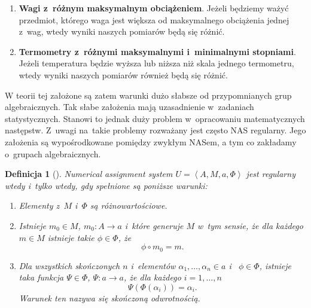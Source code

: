 \documentclass[12pt,a4paper]{report}
\newtheorem{definition}{Definicja}[chapter]
\newcommand{\tuple}[1]{\left\langle {#1} \right\rangle}
\begin{document}
\begin{enumerate}
\item
\textbf{Wagi z~różnym maksymalnym obciążeniem}. Jeżeli będziemy ważyć przedmiot, którego waga jest większa od maksymalnego obciążenia jednej z~wag, wtedy wyniki naszych pomiarów będą się różnić. 
\item
\textbf{Termometry z~różnymi maksymalnymi i~minimalnymi stopniami}. Jeżeli temperatura będzie wyższa lub niższa niż skala jednego termometru, wtedy wyniki naszych pomiarów również będą się różnić.
\end{enumerate}  
W teorii tej założone są zatem warunki dużo słabsze od przypomnianych grup algebraicznych. Tak słabe założenia mają uzasadnienie w~zadaniach statystycznych. Stanowi to jednak duży problem w~opracowaniu matematycznych następstw. Z~uwagi na~takie problemy rozważany jest często NAS regularny. Jego założenia są wypośrodkowane pomiędzy zwykłym NASem, a tym co zakładamy o~grupach algebraicznych.  
\begin{definition}[{\citep[Def. 2]{adams1965theory}}]
Numerical assignment system $U=\tuple{A, M, a, \Phi}$ jest regularny wtedy i~tylko wtedy, gdy spełnione są poniższe warunki:
\begin{enumerate}
\item
Elementy z~$M$ i~$\Phi$ są różnowartościowe.
\item
Istnieje $m_{0}\in M$, $m_0:A\to a$ i~które generuje $M$ w~tym sensie, że dla każdego $m\in M$ istnieje takie $\phi\in \Phi$, że
$$
\phi \circ m_{0}=m.
$$
\item
Dla wszystkich skończonych $n$ i~elementów $\alpha_{1},\dots,\alpha_{n}\in a$ i~ $\phi\in \Phi$, istnieje taka funkcja $\Psi\in \Phi$, $\Psi:a\to a$, że dla każdego $i=1,\ldots,n$ 
$$
\Psi(\Phi(\alpha_{i}))=\alpha_{i}.
$$
Warunek ten nazywa się skończoną odwrotnością.
\end{enumerate}
\end{definition}
\end{document}
